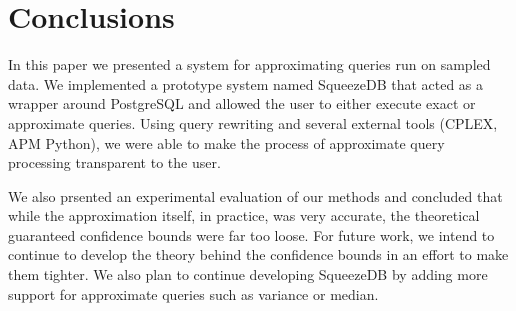 \documentclass[11pt]{article}
\begin{document}
\section{Conclusions}

In this paper we presented a system for approximating queries run on
sampled data. We implemented a prototype system named SqueezeDB that
acted as a wrapper around PostgreSQL and allowed the user to either
execute exact or approximate queries. Using query rewriting and
several external tools (CPLEX, APM Python), we were able to make the
process of approximate query processing transparent to the user. 

We also prsented an experimental evaluation of our methods and
concluded that while the approximation itself, in practice, was very
accurate, the theoretical guaranteed confidence bounds were far too
loose. For future work, we intend to continue to develop the theory
behind the confidence bounds in an effort to make them tighter. We
also plan to continue developing SqueezeDB by adding more support for
approximate queries such as variance or median. 




\end{document}
